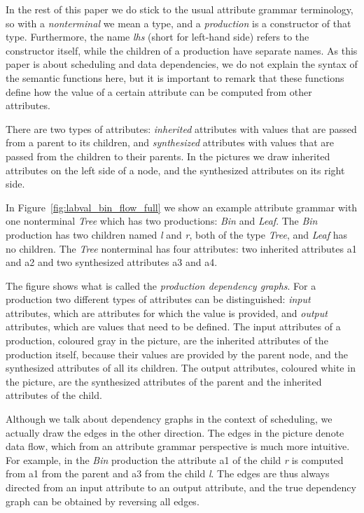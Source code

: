 \documentclass{llncs}
\newcommand{\figref}[1]{Figure~\ref{#1}}
\begin{document}
In the rest of this paper we do stick to the usual attribute grammar terminology, so with a \emph{nonterminal} we mean a type, and a \emph{production} is a constructor of that type. Furthermore, the name \emph{lhs} (short for left-hand side) refers to the constructor itself, while the children of a production have separate names. As this paper is about scheduling and data dependencies, we do not explain the syntax of the semantic functions here, but it is important to remark that these functions define how the value of a certain attribute can be computed from other attributes.

There are two types of attributes: \emph{inherited} attributes with values that are passed from a parent to its children, and \emph{synthesized} attributes with values that are passed from the children to their parents. In the pictures we draw inherited attributes on the left side of a node, and the synthesized attributes on its right side.


In \figref{fig:labval_bin_flow_full} we show an example attribute grammar with one nonterminal \emph{Tree} which has two productions: \emph{Bin} and \emph{Leaf}. The \emph{Bin} production has two children named \emph{l} and \emph{r}, both of the type \emph{Tree}, and \emph{Leaf} has no children. The \emph{Tree} nonterminal has four attributes: two inherited attributes a1 and a2 and two synthesized attributes a3 and a4.

The figure shows what is called the \emph{production dependency graphs}. For a production two different types of attributes can be distinguished: \emph{input} attributes, which are attributes for which the value is provided, and \emph{output} attributes, which are values that need to be defined. The input attributes of a production, coloured gray in the picture, are the inherited attributes of the production itself, because their values are provided by the parent node, and the synthesized attributes of all its children. The output attributes, coloured white in the picture, are the synthesized attributes of the parent and the inherited attributes of the child.

Although we talk about dependency graphs in the context of scheduling, we actually draw the edges in the other direction. The edges in the picture denote data flow, which from an attribute grammar perspective is much more intuitive. For example, in the \emph{Bin} production the attribute a1 of the child \emph{r} is computed from a1 from the parent and a3 from the child \emph{l}. The edges are thus always directed from an input attribute to an output attribute, and the true dependency graph can be obtained by reversing all edges.
\end{document}
